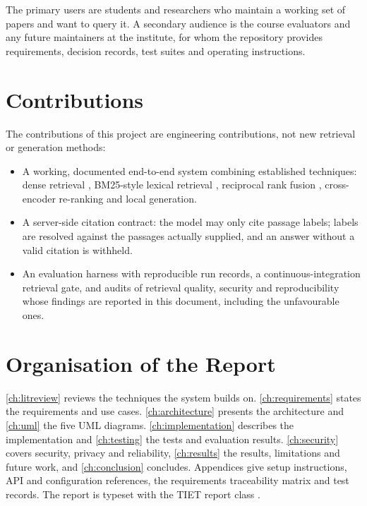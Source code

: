 The primary users are students and researchers who maintain a working set of papers and want to query it. A
secondary audience is the course evaluators and any future maintainers at the institute, for whom the repository
provides requirements, decision records, test suites and operating instructions.

\section{Contributions}

The contributions of this project are engineering contributions, not new retrieval or generation methods:
\begin{itemize}
  \item A working, documented end-to-end system combining established techniques: dense retrieval
        \cite{karpukhin2020dpr,reimers2019sbert}, BM25-style lexical retrieval \cite{robertson2009bm25}, reciprocal
        rank fusion \cite{cormack2009rrf}, cross-encoder re-ranking \cite{nogueira2019rerank} and local generation.
  \item A server-side citation contract: the model may only cite passage labels; labels are resolved against the
        passages actually supplied, and an answer without a valid citation is withheld.
  \item An evaluation harness with reproducible run records, a continuous-integration retrieval gate, and audits
        of retrieval quality, security and reproducibility whose findings are reported in this document, including
        the unfavourable ones.
\end{itemize}

\section{Organisation of the Report}

\autoref{ch:litreview} reviews the techniques the system builds on. \autoref{ch:requirements} states the
requirements and use cases. \autoref{ch:architecture} presents the architecture and \autoref{ch:uml} the five UML
diagrams. \autoref{ch:implementation} describes the implementation and \autoref{ch:testing} the tests and
evaluation results. \autoref{ch:security} covers security, privacy and reliability, \autoref{ch:results} the
results, limitations and future work, and \autoref{ch:conclusion} concludes. Appendices give setup instructions,
API and configuration references, the requirements traceability matrix and test records. The report is typeset
with the TIET report class \cite{tietreport}.
